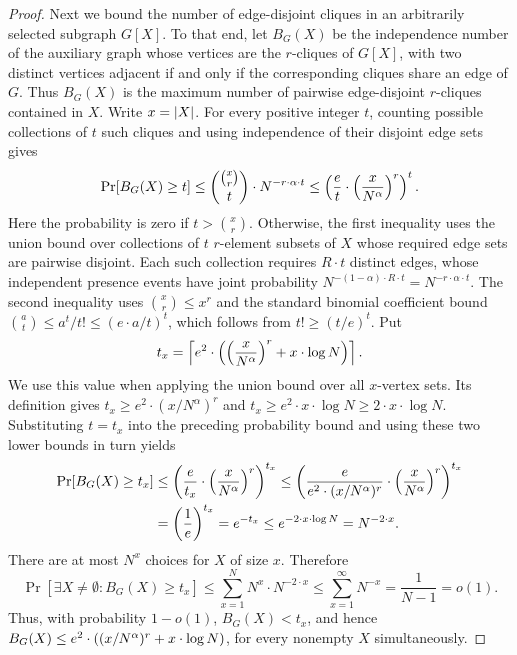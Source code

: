 \begin{proof}
    Next we bound the number of edge-disjoint cliques in an arbitrarily selected subgraph $G[X]$. To that end, let $B_G(X)$ be the independence number of the auxiliary graph whose vertices are the $r$-cliques of $G[X]$, with two distinct vertices adjacent if and only if the corresponding cliques share an edge of $G$. Thus $B_G(X)$ is the maximum number of pairwise edge-disjoint $r$-cliques contained in $X$. Write $x=\mathopen{}\left| X \right|$. For every positive integer $t$, counting possible collections of $t$ such cliques and using independence of their disjoint edge sets gives
    \[
        \Pr[B_G(X)\geq t]
        \leq\binom{\binom{x}{r}}{t} \cdot N^{-r\cdot\alpha\cdot t}
        \leq\mathopen{}\left( \frac{e}{t}\cdot\mathopen{}\left( \frac{x}{N^\alpha} \right)^r \right)^t.
    \]
    Here the probability is zero if $t>\binom{x}{r}$. Otherwise, the first inequality uses the union bound over collections of $t$ $r$-element subsets of $X$ whose required edge sets are pairwise disjoint. Each such collection requires $R\cdot t$ distinct edges, whose independent presence events have joint probability $N^{-(1-\alpha)\cdot R\cdot t}=N^{-r\cdot\alpha\cdot t}$. The second inequality uses $\binom{x}{r}\leq x^r$ and the standard binomial coefficient bound $\binom{a}{t}\leq a^t/t!\leq(e\cdot a/t)^t$, which follows from $t!\geq(t/e)^t$. Put
    \[
        t_x=\left\lceil e^2 \cdot \mathopen{}\left( \mathopen{}\left( \frac{x}{N^\alpha} \right)^r+x \cdot \log N \right)\right\rceil.
    \]
    We use this value when applying the union bound over all $x$-vertex sets. Its definition gives $t_x\geq e^2\cdot(x/N^\alpha)^r$ and $t_x\geq e^2\cdot x\cdot\log N\geq2\cdot x\cdot\log N$. Substituting $t=t_x$ into the preceding probability bound and using these two lower bounds in turn yields
    \begin{align*}
        \Pr[B_G(X)\geq t_x]
        &\leq\mathopen{}\left( \frac{e}{t_x}\cdot\mathopen{}\left( \frac{x}{N^\alpha} \right)^r \right)^{t_x}\leq\mathopen{}\left( \frac{e}{e^2\cdot(x/N^\alpha)^r}\cdot\mathopen{}\left( \frac{x}{N^\alpha} \right)^r \right)^{t_x}\\
        &=\mathopen{}\left( \frac{1}{e} \right)^{t_x}=e^{-t_x}\leq e^{-2\cdot x\cdot\log N}=N^{-2\cdot x}.
    \end{align*}
    There are at most $N^x$ choices for $X$ of size $x$. Therefore
    \[
        \Pr[\exists X\neq\emptyset\colon B_G(X)\geq t_{x}]
        \leq\sum_{x=1}^N N^x\cdot N^{-2\cdot x}
        \leq\sum_{x=1}^{\infty}N^{-x}
        =\frac{1}{N-1}=o(1).
    \]
    Thus, with probability $1-o(1)$, $B_G(X)<t_x$, and hence $B_G(X)\leq e^2\cdot\mathopen{}\left( (x/N^\alpha)^r+x\cdot\log N \right)$, for every nonempty $X$ simultaneously.


\end{proof}
